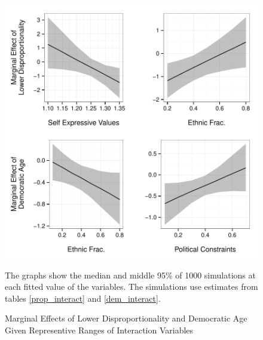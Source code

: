 \documentclass[a4paper]{article}\usepackage[]{graphicx}\usepackage[]{color}
\newenvironment{knitrout}{}{} %
\begin{document}
\begin{figure}
    \begin{center}
\begin{knitrout}
\color{fgcolor}
\includegraphics[width=0.95\linewidth]{figure/marginalEffects-1} 

\end{knitrout}
    \end{center}
    \caption{Marginal Effects of Lower Disproportionality and Democratic Age Given Representive Ranges of Interaction Variables}
    \label{marginal_effect_plot}
    \begin{singlespace}
      {\scriptsize{The graphs show the median and middle 95\% of 1000 simulations at each fitted value of the variables. The simulations use estimates from tables \ref{prop_interact} and \ref{dem_interact}.}}
    \end{singlespace}
\end{figure}


\end{document}
